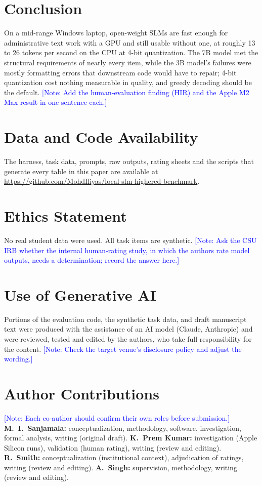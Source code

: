 \documentclass[sigconf,nonacm]{acmart}
\newcommand{\todonote}[1]{\textcolor{blue}{\textsf{[Note: #1]}}}
\newcommand{\todonote}[1]{\errmessage{Author note left in final build: #1}}
\begin{document}
\section{Conclusion}
On a mid-range Windows laptop, open-weight SLMs are fast enough for administrative text work with a GPU and still usable without one, at roughly 13 to 26 tokens per second on the CPU at 4-bit quantization.
The 7B model met the structural requirements of nearly every item, while the 3B model's failures were mostly formatting errors that downstream code would have to repair; 4-bit quantization cost nothing measurable in quality, and greedy decoding should be the default.
\todonote{Add the human-evaluation finding (HIR) and the Apple M2 Max result in one sentence each.}

\section*{Data and Code Availability}
The harness, task data, prompts, raw outputs, rating sheets and the scripts that generate every table in this paper are available at \url{https://github.com/MohdIliyas/local-slm-highered-benchmark}.

\section*{Ethics Statement}
No real student data were used. All task items are synthetic.
\todonote{Ask the CSU IRB whether the internal human-rating study, in which the authors rate model outputs, needs a determination; record the answer here.}

\section*{Use of Generative AI}
Portions of the evaluation code, the synthetic task data, and draft manuscript text were produced with the assistance of an AI model (Claude, Anthropic) and were reviewed, tested and edited by the authors, who take full responsibility for the content.
\todonote{Check the target venue's disclosure policy and adjust the wording.}

\section*{Author Contributions}
\todonote{Each co-author should confirm their own roles before submission.}
\textbf{M.~I.~Sanjamala:} conceptualization, methodology, software, investigation, formal analysis, writing (original draft).
\textbf{K.~Prem Kumar:} investigation (Apple Silicon runs), validation (human rating), writing (review and editing).
\textbf{R.~Smith:} conceptualization (institutional context), adjudication of ratings, writing (review and editing).
\textbf{A.~Singh:} supervision, methodology, writing (review and editing).



\end{document}
